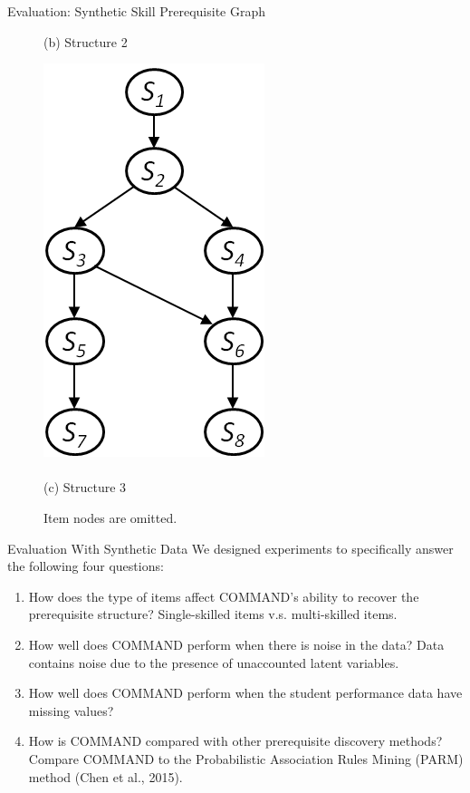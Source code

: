 \documentclass[hyperref={pdfpagelabels=false}]{beamer}
\begin{document}
\begin{frame}{Evaluation: Synthetic Skill Prerequisite Graph}
\begin{figure}[!ht]
\begin{minipage}[b]{0.3\linewidth}
			(b) Structure 2
		\end{minipage}
		\quad
		\begin{minipage}[b]{0.3\linewidth}
			\centering
			\includegraphics[width=0.6\linewidth]{figures/model3.png}\\~\\
			(c) Structure 3
		\end{minipage}	
		\caption{Item nodes are omitted.}
		\label{fig:syn-nets}
	\end{figure}
\end{frame}

\begin{frame}{Evaluation With Synthetic Data}
	We designed experiments to specifically answer the following four questions:
	\begin{enumerate}\small
		\item How does the type of items affect COMMAND's ability to recover the prerequisite structure?
		\alert{Single-skilled items v.s. multi-skilled items}. 
		\item How well does COMMAND perform when there is noise in the data?
		\alert{Data contains noise due to the presence of unaccounted latent variables}.
		\item How well does COMMAND perform when the student performance data have \alert{missing values}?
		\item How is COMMAND compared with other prerequisite discovery methods?
		Compare COMMAND to the Probabilistic Association Rules Mining (PARM) method (Chen et al., 2015).
	\end{enumerate}
\end{frame}
\end{document}
